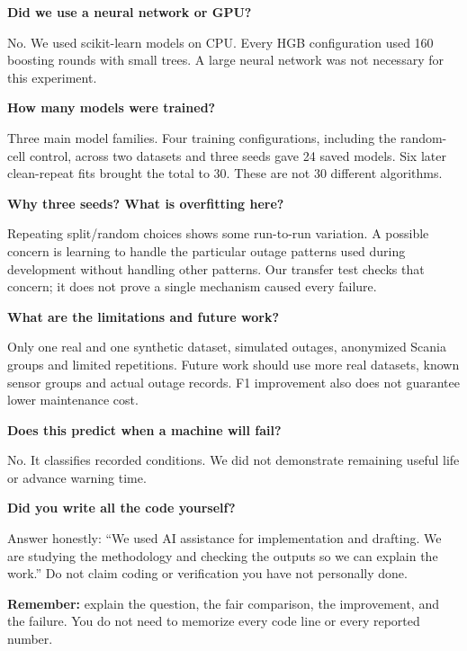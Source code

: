 \documentclass[11pt,a4paper]{article}
\newcommand{\qa}[2]{\textbf{#1}\par #2\par}
\begin{document}
\qa{Did we use a neural network or GPU?}{No. We used scikit-learn models on CPU. Every HGB configuration used 160 boosting rounds with small trees. A large neural network was not necessary for this experiment.}
\qa{How many models were trained?}{Three main model families. Four training configurations, including the random-cell control, across two datasets and three seeds gave 24 saved models. Six later clean-repeat fits brought the total to 30. These are not 30 different algorithms.}
\qa{Why three seeds? What is overfitting here?}{Repeating split/random choices shows some run-to-run variation. A possible concern is learning to handle the particular outage patterns used during development without handling other patterns. Our transfer test checks that concern; it does not prove a single mechanism caused every failure.}
\qa{What are the limitations and future work?}{Only one real and one synthetic dataset, simulated outages, anonymized Scania groups and limited repetitions. Future work should use more real datasets, known sensor groups and actual outage records. F1 improvement also does not guarantee lower maintenance cost.}
\qa{Does this predict when a machine will fail?}{No. It classifies recorded conditions. We did not demonstrate remaining useful life or advance warning time.}
\qa{Did you write all the code yourself?}{Answer honestly: ``We used AI assistance for implementation and drafting. We are studying the methodology and checking the outputs so we can explain the work.'' Do not claim coding or verification you have not personally done.}

\textbf{Remember:} explain the question, the fair comparison, the improvement, and the failure. You do not need to memorize every code line or every reported number.
\end{document}
